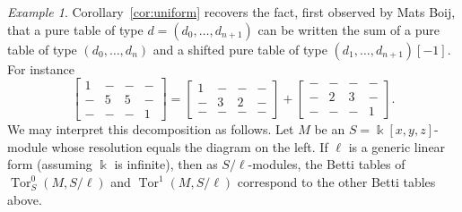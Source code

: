\documentclass[12pt]{amsart}
\theoremstyle{definition}
\theoremstyle{remark}
\newtheorem{example}[lemma]{Example}
\newcommand{\Tor}{\operatorname{Tor}}
\newcommand{\kk}{\Bbbk}
\begin{document}
\begin{example}
Corollary~\ref{cor:uniform} recovers the fact, first observed by Mats Boij, that a pure table of type $d=(d_0, \dots, d_{n+1})$ can be written the sum of a pure table of type $(d_0, \dots, d_n)$ and a shifted pure table of type $(d_1, \dots, d_{n+1})[-1]$.  For instance
\[
\begin{bmatrix}
1&-&-&-\\
-&5&5&-\\
-&-&-&1
\end{bmatrix}
=
\begin{bmatrix}
1&-&-&-\\
-&3&2&-\\
-&-&-&-
\end{bmatrix}
+
\begin{bmatrix}
-&-&-&-\\
-&2&3&-\\
-&-&-&1
\end{bmatrix}.
\]
We may interpret this decomposition as follows.  Let $M$ be an $S=\kk[x,y,z]$-module whose resolution equals the diagram on the left. If $\ell$ is a generic linear form (assuming $\kk$ is infinite), then as $S/\ell$-modules, the Betti tables of $\Tor^0_S(M,S/\ell)$ and $\Tor^1(M,S/\ell)$ correspond to the other Betti tables above.
\end{example}
\end{document}
